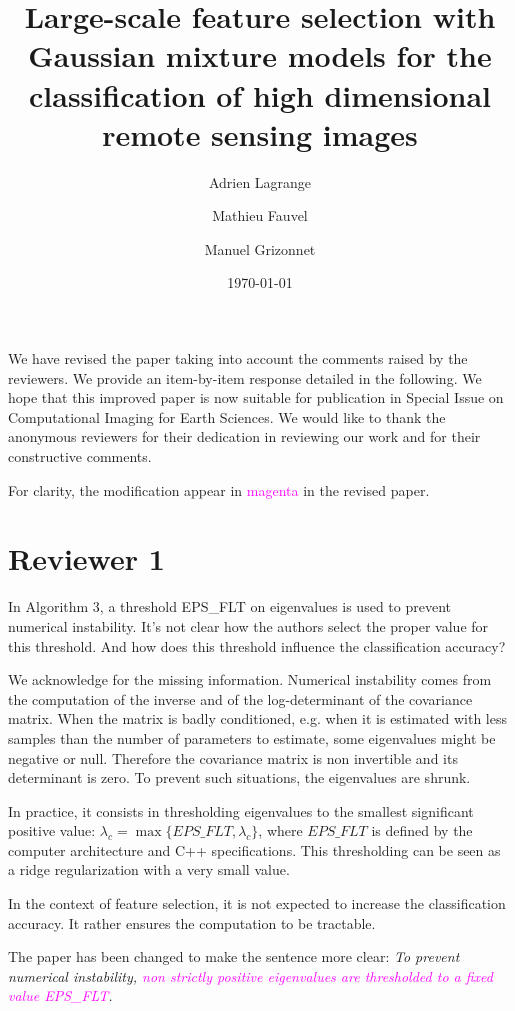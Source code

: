 \documentclass[a4paper,10pt,DIV=16]{scrartcl}
\title{Large-scale feature selection with Gaussian mixture models for the classification of high dimensional remote sensing images}
\date{\today}
\author{Adrien Lagrange \and Mathieu Fauvel \and Manuel Grizonnet}
\newcommand{\rev}[1]{\textcolor{magenta}{#1}}
\begin{document}
\maketitle

We have revised  the paper taking into account the  comments raised by
the reviewers.   We provide an  item-by-item response detailed  in the
following.   We hope  that this  improved  paper is  now suitable  for
publication  in  {\sc  Special Issue on Computational Imaging for Earth Sciences}.   We would  like  to  thank  the
anonymous reviewers for their dedication in reviewing our work and for
their constructive comments.

For clarity,  the modification appear  in \textcolor{magenta}{magenta}
in the revised paper.


\section{Reviewer 1}

\begin{revbox}
In Algorithm 3, a threshold EPS\_FLT on eigenvalues is used to prevent numerical instability. It’s not clear how the authors select the proper value for this threshold. And how does this threshold influence the classification accuracy?

\begin{resbox}
  We acknowledge for the missing information. Numerical instability comes from
  the computation of the inverse and of the log-determinant of the covariance
  matrix. When the matrix is badly conditioned, e.g. when it is estimated with
  less samples than the number of parameters to estimate, some eigenvalues might
  be negative or null. Therefore the covariance matrix is non invertible and its determinant is zero. To prevent such situations, the eigenvalues are shrunk.

  In practice, it consists in thresholding eigenvalues to the smallest significant positive value: $\lambda_c = \max\{EPS\_FLT,\lambda_c\}$, where $EPS\_FLT$ is defined by the computer architecture and C++ specifications. This thresholding can be seen as a ridge regularization with a very small value.

  In the context of feature selection, it is not expected to increase the classification accuracy. It rather ensures the computation to be tractable.

  The paper has been changed to make the sentence more clear: \emph{To
    prevent  numerical  instability,   \rev{non  strictly  positive
      eigenvalues are thresholded to a fixed value EPS\_FLT}.}
  \end{resbox}

\end{revbox}
\end{document}
